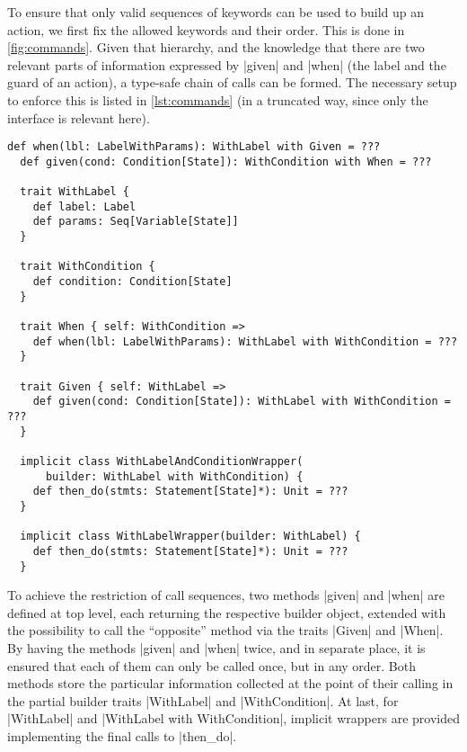 To ensure that only valid sequences of keywords can be used to build up an action, we first fix the
allowed keywords and their order. This is done in \autoref{fig:commands}. Given that hierarchy, and
the knowledge that there are two relevant parts of information expressed by |given| and |when| (the
label and the guard of an action), a type-safe chain of calls can be formed. The necessary setup to
enforce this is listed in \autoref{lst:commands} (in a truncated way, since only the interface is
relevant here). 

\begin{lstlisting}[style=floating, label=lst:commands,
  caption={The trait setup to ensure that only valid sequences of statements can be used in an
    action definition. These methods and traits are all defined in \texttt{GherkinSyntax} and mixed
    in with it. The implementations are shown as unimplemented here (\texttt{???}).}]
  def when(lbl: LabelWithParams): WithLabel with Given = ???
  def given(cond: Condition[State]): WithCondition with When = ???

  trait WithLabel {
    def label: Label
    def params: Seq[Variable[State]]
  }

  trait WithCondition {
    def condition: Condition[State]
  }

  trait When { self: WithCondition =>
    def when(lbl: LabelWithParams): WithLabel with WithCondition = ???
  }

  trait Given { self: WithLabel =>
    def given(cond: Condition[State]): WithLabel with WithCondition = ???
  }

  implicit class WithLabelAndConditionWrapper(
      builder: WithLabel with WithCondition) {
    def then_do(stmts: Statement[State]*): Unit = ???
  }

  implicit class WithLabelWrapper(builder: WithLabel) {
    def then_do(stmts: Statement[State]*): Unit = ???
  }
\end{lstlisting}

To achieve the restriction of call sequences, two methods |given| and |when| are defined at top
level, each returning the respective builder object, extended with the possibility to call the
\enquote{opposite} method via the traits |Given| and |When|. By having the methods |given| and
|when| twice, and in separate place, it is ensured that each of them can only be called once, but in
any order. Both methods store the particular information collected at the point of their calling in
the partial builder traits |WithLabel| and |WithCondition|. At last, for |WithLabel| and %
|WithLabel with WithCondition|, implicit wrappers are provided implementing the final calls to
|then_do|. 

